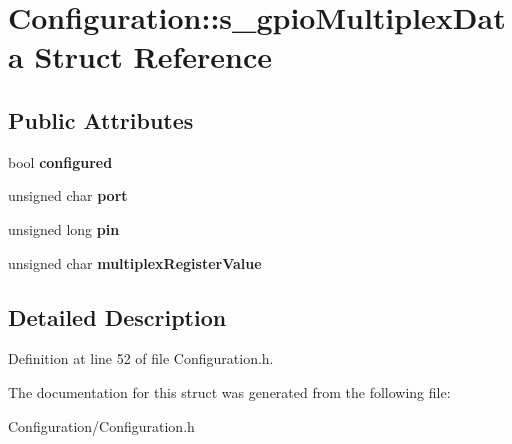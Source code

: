 \section{Configuration\+:\+:s\+\_\+gpio\+Multiplex\+Data Struct Reference}
\label{struct_configuration_1_1s__gpio_multiplex_data}
\subsection*{Public Attributes}
\begin{DoxyCompactItemize}
\item 
bool {\bfseries configured}\label{struct_configuration_1_1s__gpio_multiplex_data_aeb0a304a75913de87672334caa0624b0}

\item 
unsigned char {\bfseries port}\label{struct_configuration_1_1s__gpio_multiplex_data_a8c67a84197881a632d9f9db771c213c0}

\item 
unsigned long {\bfseries pin}\label{struct_configuration_1_1s__gpio_multiplex_data_aac4843d2e62b0c61c816e00fdc3681d8}

\item 
unsigned char {\bfseries multiplex\+Register\+Value}\label{struct_configuration_1_1s__gpio_multiplex_data_a1fd44e3d77d33dadd1fbdd5ba2745bd7}

\end{DoxyCompactItemize}


\subsection{Detailed Description}


Definition at line 52 of file Configuration.\+h.



The documentation for this struct was generated from the following file\+:\begin{DoxyCompactItemize}
\item 
Configuration/Configuration.\+h\end{DoxyCompactItemize}
